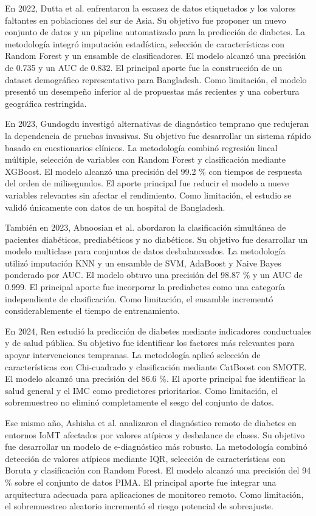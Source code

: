 \documentclass[journal]{IEEEtran}
\begin{document}
En 2022, Dutta et al. \cite{Dutta2022} enfrentaron la escasez de datos etiquetados y los valores faltantes en poblaciones del sur de Asia. Su objetivo fue proponer un nuevo conjunto de datos y un pipeline automatizado para la predicción de diabetes. La metodología integró imputación estadística, selección de características con Random Forest y un ensamble de clasificadores. El modelo alcanzó una precisión de 0.735 y un AUC de 0.832. El principal aporte fue la construcción de un dataset demográfico representativo para Bangladesh. Como limitación, el modelo presentó un desempeño inferior al de propuestas más recientes y una cobertura geográfica restringida.

En 2023, Gundogdu \cite{Gndodu2023} investigó alternativas de diagnóstico temprano que redujeran la dependencia de pruebas invasivas. Su objetivo fue desarrollar un sistema rápido basado en cuestionarios clínicos. La metodología combinó regresión lineal múltiple, selección de variables con Random Forest y clasificación mediante XGBoost. El modelo alcanzó una precisión del 99.2 \% con tiempos de respuesta del orden de milisegundos. El aporte principal fue reducir el modelo a nueve variables relevantes sin afectar el rendimiento. Como limitación, el estudio se validó únicamente con datos de un hospital de Bangladesh.

También en 2023, Abnoosian et al. \cite{Abnoosian2023} abordaron la clasificación simultánea de pacientes diabéticos, prediabéticos y no diabéticos. Su objetivo fue desarrollar un modelo multiclase para conjuntos de datos desbalanceados. La metodología utilizó imputación KNN y un ensamble de SVM, AdaBoost y Naive Bayes ponderado por AUC. El modelo obtuvo una precisión del 98.87 \% y un AUC de 0.999. El principal aporte fue incorporar la prediabetes como una categoría independiente de clasificación. Como limitación, el ensamble incrementó considerablemente el tiempo de entrenamiento.

En 2024, Ren \cite{Ren2024} estudió la predicción de diabetes mediante indicadores conductuales y de salud pública. Su objetivo fue identificar los factores más relevantes para apoyar intervenciones tempranas. La metodología aplicó selección de características con Chi-cuadrado y clasificación mediante CatBoost con SMOTE. El modelo alcanzó una precisión del 86.6 \%. El aporte principal fue identificar la salud general y el IMC como predictores prioritarios. Como limitación, el sobremuestreo no eliminó completamente el sesgo del conjunto de datos.

Ese mismo año, Ashisha et al. \cite{Ashisha2024} analizaron el diagnóstico remoto de diabetes en entornos IoMT afectados por valores atípicos y desbalance de clases. Su objetivo fue desarrollar un modelo de e-diagnóstico más robusto. La metodología combinó detección de valores atípicos mediante IQR, selección de características con Boruta y clasificación con Random Forest. El modelo alcanzó una precisión del 94 \% sobre el conjunto de datos PIMA. El principal aporte fue integrar una arquitectura adecuada para aplicaciones de monitoreo remoto. Como limitación, el sobremuestreo aleatorio incrementó el riesgo potencial de sobreajuste.
\end{document}
